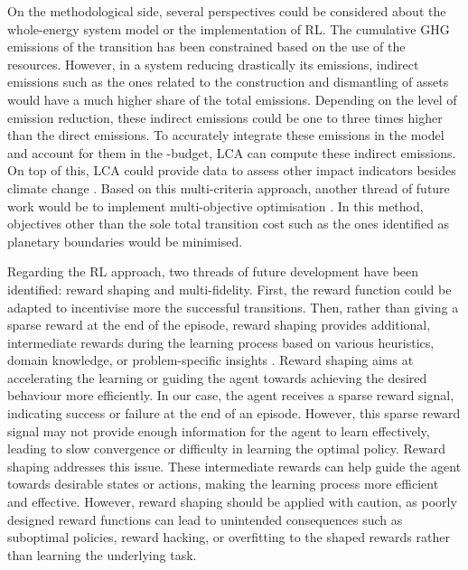 On the methodological side, several perspectives could be considered about the whole-energy system model or the implementation of \gls{RL}. The cumulative \acrfull{GHG} emissions of the transition has been constrained based on the use of the resources. However, in a system reducing drastically its emissions, indirect emissions such as the ones related to the construction and dismantling of assets would have a much higher share of the total emissions. Depending on the level of emission reduction, these indirect emissions could be one to three times higher than the direct emissions. To accurately integrate these emissions in the model and account for them in the -budget, \gls{LCA} can compute these indirect emissions. On top of this, \gls{LCA} could provide data to assess other impact indicators besides climate change \cite{astudillo2018integrating}. Based on this multi-criteria approach, another thread of future work would be to implement multi-objective optimisation \cite{dubois2023multi}. In this method, objectives other than the sole total transition cost such as the ones identified as planetary boundaries \cite{richardson2023earth} would be minimised.

Regarding the \gls{RL} approach, two threads of future development have been identified: reward shaping and multi-fidelity.  First, the reward function could be adapted to incentivise more the successful transitions. Then, rather than giving a sparse reward at the end of the episode, reward shaping provides additional, intermediate rewards during the learning process based on various heuristics, domain knowledge, or problem-specific insights \cite{hu2020learning}. Reward shaping aims at accelerating the learning or guiding the agent towards achieving the desired behaviour more efficiently. In our case, the agent receives a sparse reward signal, indicating success or failure at the end of an episode. However, this sparse reward signal may not provide enough information for the agent to learn effectively, leading to slow convergence or difficulty in learning the optimal policy. Reward shaping addresses this issue. These intermediate rewards can help guide the agent towards desirable states or actions, making the learning process more efficient and effective. However, reward shaping should be applied with caution, as poorly designed reward functions can lead to unintended consequences such as suboptimal policies, reward hacking, or overfitting to the shaped rewards rather than learning the underlying task.  

